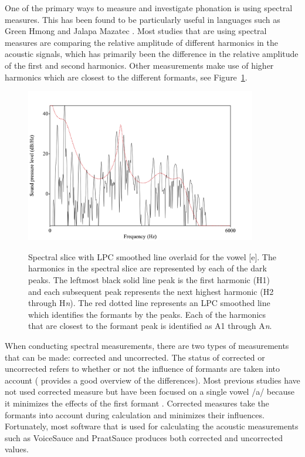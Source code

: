 \documentclass[12pt, letterpaper]{article}
\begin{document}
One of the primary ways to measure and investigate phonation is using spectral measures. This has been found to be particularly useful in languages such as Green Hmong \citep{huffmanMeasuresPhonationType1987,andruskiPhonationTypesProduction2000} and Jalapa Mazatec \citep{silvermanPhoneticStructuresJalapa1995,blankenshipTimeCourseBreathiness1997}. Most studies that are using spectral measures are comparing the relative amplitude of different harmonics in the acoustic signals, which has primarily been the difference in the relative amplitude of the first and second harmonics. Other measurements make use of higher harmonics which are closest to the different formants, see Figure~\ref{fig:Harmonics}. 
\begin{figure}[!h]
	\centering
	\includegraphics[width=0.9\textwidth]{../Harmonics.png}
	\label{fig:Harmonics}
	\caption{Spectral slice with LPC smoothed line overlaid for the vowel [e]. The harmonics in the spectral slice are represented by each of the dark peaks. The leftmost black solid line peak is the first harmonic (H1) and each subsequent peak represents the next highest harmonic (H2 through H\textit{n}). The red dotted line represents an LPC smoothed line which identifies the formants by the peaks. Each of the harmonics that are closest to the formant peak is identified as A1 through A\textit{n}.}
\end{figure}

When conducting spectral measurements, there are two types of measurements that can be made: corrected and uncorrected. The status of corrected or uncorrected refers to whether or not the influence of formants are taken into account (\cite{garellekPhoneticsVoice2019} provides a good overview of the differences). Most previous studies have not used corrected measure but have been focused on a single vowel /a/ because it minimizes the effects of the first formant \citep{espositoVariationContrastivePhonation2010}. Corrected measures take the formants into account during calculation and minimizes their influences. Fortunately, most software that is used for calculating the acoustic measurements such as VoiceSauce \citep{shueVOICESAUCEProgramVoice2009} and PraatSauce \citep{kirbyPraatSauce2022} produces both corrected and uncorrected values. 
\end{document}
